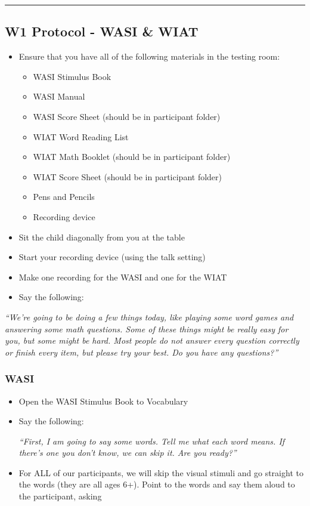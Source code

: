 \documentclass[
]{book}
\providecommand{\tightlist}{%
  \setlength{\itemsep}{0pt}\setlength{\parskip}{0pt}}
\begin{document}
\begin{center}\rule{0.5\linewidth}{0.5pt}\end{center}

\hypertarget{w1-protocol---wasi-wiat}{%
\subsection{W1 Protocol - WASI \& WIAT}\label{w1-protocol---wasi-wiat}}

\begin{itemize}
\tightlist
\item
  Ensure that you have all of the following materials in the testing room:

  \begin{itemize}
  \tightlist
  \item
    WASI Stimulus Book
  \item
    WASI Manual
  \item
    WASI Score Sheet (should be in participant folder)
  \item
    WIAT Word Reading List
  \item
    WIAT Math Booklet (should be in participant folder)
  \item
    WIAT Score Sheet (should be in participant folder)
  \item
    Pens and Pencils
  \item
    Recording device
  \end{itemize}
\item
  Sit the child diagonally from you at the table
\item
  Start your recording device (using the talk setting)
\item
  Make one recording for the WASI and one for the WIAT
\item
  Say the following:
\end{itemize}

\emph{``We're going to be doing a few things today, like playing some word games and answering some math questions. Some of these things might be really easy for you, but some might be hard. Most people do not answer every question correctly or finish every item, but please try your best. Do you have any questions?''}

\hypertarget{wasi-1}{%
\subsubsection{WASI}\label{wasi-1}}

\begin{itemize}
\item
  Open the WASI Stimulus Book to Vocabulary
\item
  Say the following:

  \emph{``First, I am going to say some words. Tell me what each word means.
  If there's one you don't know, we can skip it. Are you ready?''}
\item
  For ALL of our participants, we will skip the visual stimuli and go straight to the words (they are all ages 6+). Point to the words and say them aloud to the participant, asking
\end{itemize}
\end{document}
